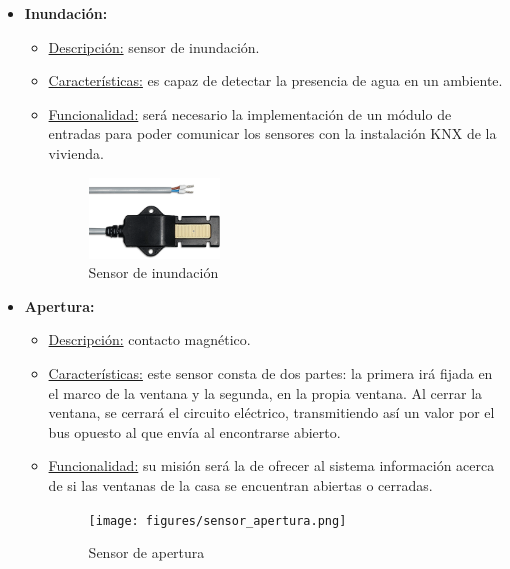 \begin{itemize}
\item \textbf{Inundación:} 
	\begin{itemize}
	\item\underline{Descripción:} sensor de inundación.
	\item \underline{Características:} es capaz de detectar la presencia de agua en un ambiente.
	\item \underline{Funcionalidad:} será necesario la implementación de un módulo de entradas para poder comunicar los sensores con la instalación KNX de la vivienda.
	\begin{figure}[h]
	\centering
	\includegraphics[width=0.35\textwidth]{figures/sensor_inundacion.png}   
	\caption{Sensor de inundación}
	\label{fig:sensor_inundacion}
	\end{figure}
	\end{itemize} 

\item \textbf{Apertura:} 
	\begin{itemize}
	\item\underline{Descripción:} contacto magnético.
	\item \underline{Características:} este sensor consta de dos partes: la primera irá fijada en el marco de la ventana y la segunda, en la propia ventana. Al cerrar la ventana, se cerrará el circuito eléctrico, transmitiendo así un valor por el bus opuesto al que envía al encontrarse abierto.
	\item \underline{Funcionalidad:} su misión será la de ofrecer al sistema información acerca de si las ventanas de la casa se encuentran abiertas o cerradas.
	\begin{figure}[h]
	\centering
	\texttt{[image: figures/sensor\_apertura.png]}   
	\caption{Sensor de apertura}
	\label{fig:sensor_apertura}
	\end{figure}
	\end{itemize} 


\end{itemize}
